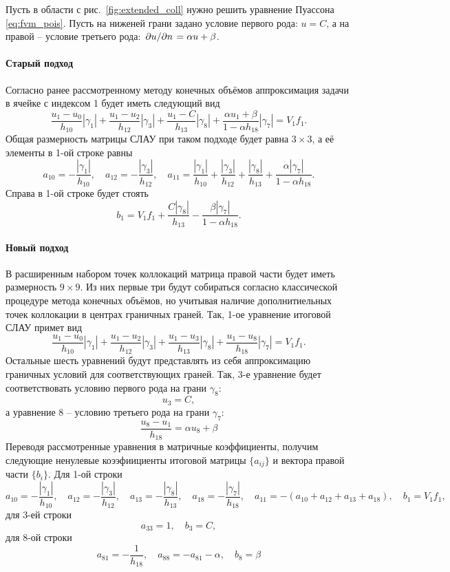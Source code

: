 Пусть в области с рис.~\ref{fig:extended_coll} нужно решить
уравнение Пуассона \cref{eq:fvm_pois}.
Пусть на ниженей грани задано условие первого рода: $u = C$,
а на правой -- условие третьего рода: $\left.\partial u\middle/\partial n\right. = \alpha u + \beta$.

\paragraph{Старый подход}
Согласно ранее рассмотренному методу конечных объёмов
аппроксимация задачи в ячейке с индексом 1 будет иметь следующий вид
$$
\frac{u_1 - u_0}{h_{10}}|\gamma_1|
+\frac{u_1 - u_2}{h_{12}}|\gamma_3|
+\frac{u_1 - C}{h_{13}}|\gamma_8|
+\frac{\alpha u_1 + \beta}{1 - \alpha h_{18}}|\gamma_7|
= V_1 f_1.
$$
Общая размерность матрицы СЛАУ при таком подходе будет
равна $3\times3$, а её элементы в 1-ой строке равны
$$
a_{10} = -\frac{|\gamma_1|}{h_{10}},  \quad
a_{12} = -\frac{|\gamma_3|}{h_{12}},  \quad
a_{11} = \frac{|\gamma_1|}{h_{10}}  + \frac{|\gamma_3|}{h_{12}} + \frac{|\gamma_8|}{h_{13}} + \frac{\alpha|\gamma_7|}{1 - \alpha h_{18}}.
$$
Справа в 1-ой строке будет стоять
$$
b_1 = V_1 f_1 + \frac{C |\gamma_8|}{h_{13}} - \frac{\beta |\gamma_7|}{1 - \alpha h_{18}}.
$$

\paragraph{Новый подход}
В расширенным набором точек коллокаций
матрица правой части будет иметь размерность $9\times9$.
Из них первые три будут собираться согласно классической процедуре
метода конечных объёмов, но учитывая наличие дополнитиельных точек коллокации в центрах
граничных граней. Так, 1-ое уравнение итоговой СЛАУ примет вид
$$
\frac{u_1 - u_0}{h_{10}}|\gamma_1|
+\frac{u_1 - u_2}{h_{12}}|\gamma_3|
+\frac{u_1 - u_3}{h_{13}}|\gamma_8|
+\frac{u_1 - u_8}{h_{18}}|\gamma_7|
= V_1 f_1.
$$
Остальные шесть уравнений будут представлять из себя
аппроксимацию граничных условий для соответствующих граней.
Так, 3-е уравнение будет соответствовать условию первого рода на грани $\gamma_8$:
$$
u_3 = C,
$$
а уравнение 8 -- условию третьего рода на грани $\gamma_7$:
$$
\frac{u_8 - u_1}{h_{18}} = \alpha u_8 + \beta
$$
Переводя рассмотренные уравнения в матричные коэффициенты, получим
следующие ненулевые коээфиициенты итоговой матрицы $\{a_{ij}\}$ и вектора правой части $\{b_i\}$. Для 1-ой строки
$$
a_{10} = -\frac{|\gamma_1|}{h_{10}},  \quad
a_{12} = -\frac{|\gamma_3|}{h_{12}},  \quad
a_{13} = -\frac{|\gamma_8|}{h_{13}},  \quad
a_{18} = -\frac{|\gamma_7|}{h_{18}},  \quad
a_{11} = -(a_{10} + a_{12} + a_{13} + a_{18}), \quad
b_1 = V_1 f_1,
$$
для 3-ей строки
$$
a_{33} = 1, \quad b_3 = C,
$$
для 8-ой строки
$$
a_{81} = -\frac{1}{h_{18}},  \quad
a_{88} = -a_{81} - \alpha, \quad
b_8  = \beta
$$

